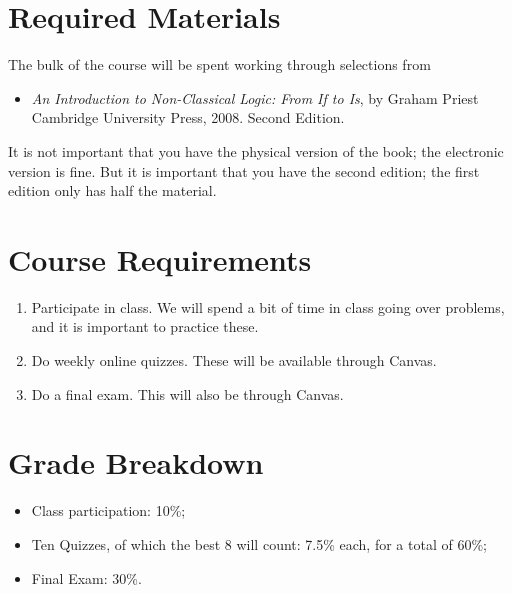 \documentclass[
]{article}
\providecommand{\tightlist}{%
  \setlength{\itemsep}{0pt}\setlength{\parskip}{0pt}}\usepackage{longtable,booktabs,array}
\begin{document}
\newpage

\hypertarget{required-materials}{%
\section{Required Materials}\label{required-materials}}

The bulk of the course will be spent working through selections from

\begin{itemize}
\tightlist
\item
  \emph{An Introduction to Non-Classical Logic: From If to Is}, by
  Graham Priest Cambridge University Press, 2008. Second Edition.
\end{itemize}

It is not important that you have the physical version of the book; the
electronic version is fine. But it is important that you have the second
edition; the first edition only has half the material.

\hypertarget{course-requirements}{%
\section{Course Requirements}\label{course-requirements}}

\begin{enumerate}
\def\labelenumi{\arabic{enumi}.}
\tightlist
\item
  Participate in class. We will spend a bit of time in class going over
  problems, and it is important to practice these.
\item
  Do weekly online quizzes. These will be available through Canvas.
\item
  Do a final exam. This will also be through Canvas.
\end{enumerate}

\hypertarget{grade-breakdown}{%
\section{Grade Breakdown}\label{grade-breakdown}}

\begin{itemize}
\tightlist
\item
  Class participation: 10\%;
\item
  Ten Quizzes, of which the best 8 will count: 7.5\% each, for a total
  of 60\%;
\item
  Final Exam: 30\%.
\end{itemize}
\end{document}
